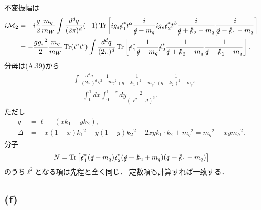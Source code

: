 \begin{center}
\end{center}
不変振幅は
\begin{align*}
  i\mathcal{M}_2 &= -i \frac{g}{2} \frac{m_q}{m_W} \int\frac{d^dq}{(2\pi)^d} (-1)
  \operatorname{Tr} \left[ ig_s \slashed\epsilon_1^\ast t^a \frac{i}{\slashed{q}-m_q} ig_s \slashed\epsilon_2^\ast t^b \frac{i}{\slashed{q}+\slashed{k}_2-m_q} \frac{i}{\slashed{q}-\slashed{k}_1-m_q} \right] \\
  &= - \frac{gg_s{}^2}{2} \frac{m_q}{m_W} \operatorname{Tr}(t^at^b) \int\frac{d^dq}{(2\pi)^d}
  \operatorname{Tr} \left[ \slashed\epsilon_1^\ast \frac{1}{\slashed{q}-m_q} \slashed\epsilon_2^\ast \frac{1}{\slashed{q}+\slashed{k}_2-m_q} \frac{1}{\slashed{q}-\slashed{k}_1-m_q} \right] .
\end{align*}
分母は(A.39)から
\begin{align*}
  & \int\frac{d^dq}{(2\pi)^d} \frac{1}{q^2-m_q{}^2} \frac{1}{(q-k_1)^2-m_q{}^2} \frac{1}{(q+k_2)^2-m_q{}^2} \\
  &= \int_0^1 dx \int_0^{1-x} dy \frac{2}{(\ell^2-\Delta)^3} .
\end{align*}
ただし
\begin{align*}
  q &= \ell + (xk_1 - yk_2) , \\
  \Delta &= - x(1-x) k_1{}^2 - y(1-y) k_2{}^2 - 2xyk_1\cdot k_2 + m_q{}^2 = m_q{}^2 - xy m_h{}^2 .
\end{align*}
分子
\[ N = \operatorname{Tr}\left[ \slashed\epsilon_1^\ast (\slashed{q}+m_q) \slashed\epsilon_2^\ast (\slashed{q}+\slashed{k}_2+m_q) (\slashed{q}-\slashed{k}_1+m_q) \right] \]
のうち\(\ell^2\)となる項は先程と全く同じ．
定数項も計算すれば一致する．

\subsection{(f)}
